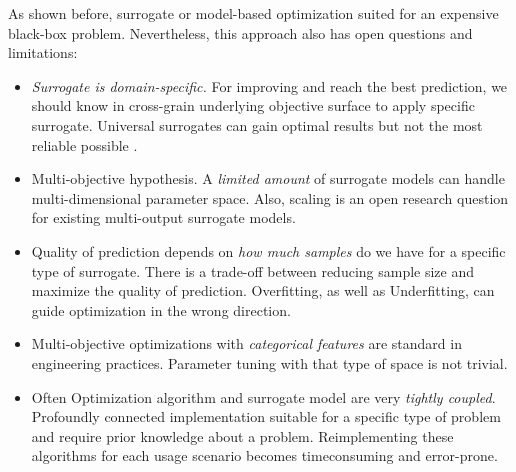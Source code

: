         As shown before, surrogate or model-based optimization suited for an expensive black-box problem. Nevertheless, this approach also has open questions and limitations:
        \begin{itemize}
            \item \emph{Surrogate is domain-specific.} For improving and reach the best prediction, we should know in cross-grain underlying objective surface to apply specific surrogate. Universal surrogates can gain optimal results but not the most reliable possible \cite{abs181207958, LuST19}.
            \item Multi-objective hypothesis. A \emph{limited amount} of surrogate models can handle multi-dimensional parameter space. Also, scaling is an open research question for existing multi-output surrogate models.
            \item Quality of prediction depends on \emph{how much samples} do we have for a specific type of surrogate. There is a trade-off between reducing sample size and maximize the quality of prediction. Overfitting, as well as Underfitting, can guide optimization in the wrong direction.
            \item Multi-objective optimizations with \emph{categorical features} are standard in engineering practices. Parameter tuning with that type of space is not trivial.
            \item Often Optimization algorithm and surrogate model are very \emph{tightly coupled}. Profoundly connected implementation suitable for a specific type of problem and require prior knowledge about a problem. Reimplementing these algorithms for each usage scenario becomes timeconsuming and error-prone. 
        \end{itemize}









